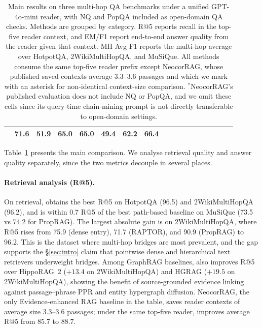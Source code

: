 \begin{table}[t]
{\begin{tabular}{llccc ccc ccc ccc ccc c}
                 & 71.6 & \textbf{51.9} & \textbf{65.0}
                 & \textbf{65.0} & \textbf{49.4} & \textbf{62.2} & \textbf{66.4} \\
\bottomrule
\end{tabular}
\vspace{1pt}
}
\caption{Main results on three multi-hop QA benchmarks under a unified
GPT-4o-mini reader, with NQ and PopQA included as open-domain QA checks.
Methods are grouped by category. R@5 reports recall in the top-five
reader context, and EM/F1 report end-to-end answer quality from the
reader given that context. MH Avg F1 reports the multi-hop average over
HotpotQA, 2WikiMultiHopQA, and MuSiQue. All methods consume the same
top-five reader prefix except NeocorRAG, whose published saved
contexts average $3.3$--$3.6$ passages and which we mark with an
asterisk for non-identical context-size comparison.
$^{\ast}$NeocorRAG's published
evaluation does not include NQ or PopQA, and we omit these cells since
its query-time chain-mining prompt is not directly transferable to
open-domain settings.}
\label{tab:main-results}
\end{table}

Table~\ref{tab:main-results} presents the main comparison. We
analyse retrieval quality and answer quality separately, since the
two metrics decouple in several places.

\paragraph{Retrieval analysis (R@5).}
On retrieval, \methodname{} obtains the best R@5 on HotpotQA
(96.5) and 2WikiMultiHopQA (96.2), and is within $0.7$ R@5 of the
best path-based baseline on MuSiQue (73.5 vs 74.2 for PropRAG).
The largest absolute gain is on 2WikiMultiHopQA, where R@5 rises
from 75.9 (dense entry), 71.7 (RAPTOR), and 90.9 (PropRAG) to
96.2. This is the dataset where
multi-hop bridges are most prevalent, and the gap supports the
\S\ref{sec:intro} claim that pointwise dense and hierarchical
text retrievers underweight bridges. Among GraphRAG baselines,
\methodname{} also improves R@5 over HippoRAG~2 ($+13.4$ on
2WikiMultiHopQA) and HGRAG ($+19.5$ on 2WikiMultiHopQA), showing the
benefit of source-grounded evidence linking against passage--phrase
PPR and entity hypergraph diffusion. NeocorRAG, the
only Evidence-enhanced RAG baseline in the table, saves
reader contexts of average size $3.3$--$3.6$ passages; under the
same top-five reader, \methodname{} improves average R@5 from
$85.7$ to $88.7$.

